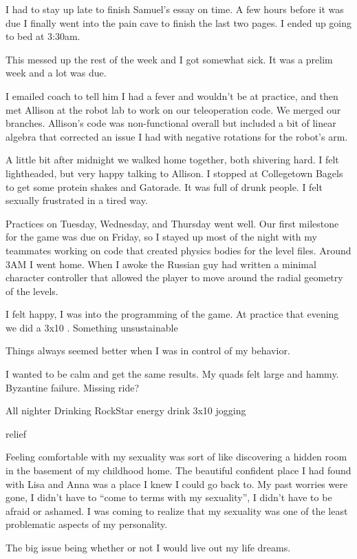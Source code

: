 I had to stay up late to finish Samuel's essay on time.  A few hours before it
was due I finally went into the pain cave to finish the last two pages.  I ended
up going to bed at 3:30am.

This messed up the rest of the week and I got somewhat sick.  It was a prelim
week and a lot was due.

I emailed coach to tell him I had a fever and wouldn't be at practice, and then
met Allison at the robot lab to work on our teleoperation code.  We merged our
branches.  Allison's code was non-functional overall but included a bit of
linear algebra that corrected an issue I had with negative rotations
for the robot's arm.

A little bit after midnight we walked home together, both shivering hard.  I
felt lightheaded, but very happy talking to Allison.  I stopped at Collegetown
Bagels to get some protein shakes and Gatorade.  It was full of drunk people.  I
felt sexually frustrated in a tired way.

Practices on Tuesday, Wednesday, and Thursday went well.  Our first milestone
for the game was due on Friday, so I stayed up most of the night with my
teammates working on code that created physics bodies for the level files.
Around 3AM I went home.  When I awoke the Russian guy had written a minimal
character controller that allowed the player to move around the radial geometry
of the levels.

I felt happy, I was into the programming of the game.  At practice that evening
we did a 3x10 .  Something unsustainable

Things always seemed better when I was in control of my behavior.

I wanted to be calm and get the same results.
My quads felt large and hammy.
Byzantine failure.
Missing ride?

All nighter
Drinking RockStar energy drink
3x10
jogging

relief

Feeling comfortable with my sexuality was sort of like discovering a hidden room
in the basement of my childhood home.  The beautiful confident place I had found
with Lisa and Anna was a place I knew I could go back to.  My past worries were
gone, I didn't have to ``come to terms with my sexuality'', I didn't have to be
afraid or ashamed.  I was coming to realize that my sexuality was one of the
least problematic aspects of my personality.

The big issue being whether or not I would live out my life dreams.

